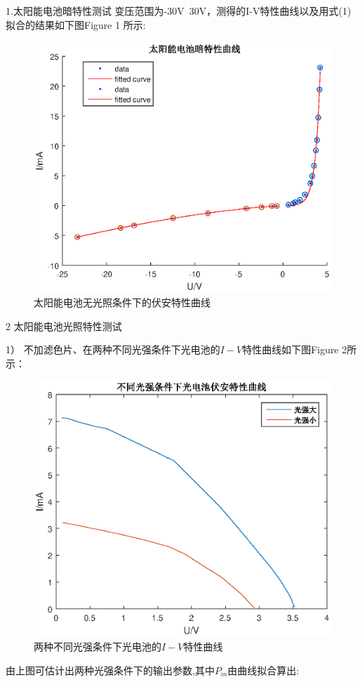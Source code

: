 ﻿\documentclass[10.5pt]{ctexart}
\begin{document}
\subsection{\textbf{}}


1.太阳能电池暗特性测试
变压范围为-30V~30V，测得的I-V特性曲线以及用式(1)拟合的结果如下图Figure 1 所示:
\begin{figure}[!ht]
\centering
\caption{太阳能电池无光照条件下的伏安特性曲线}
\includegraphics[width=400pt]{DimCharacteristic.eps}
\end{figure}

2 太阳能电池光照特性测试

1） 不加滤色片、在两种不同光强条件下光电池的$I-V$特性曲线如下图Figure 2所示：
\begin{figure}[!ht]
\centering
\caption{两种不同光强条件下光电池的$I-V$特性曲线}
\includegraphics[width=350pt]{CurrentVoltageCurve.eps}
\end{figure}
由上图可估计出两种光强条件下的输出参数,其中$P_m$由曲线拟合算出:
\newpage
\end{document}

